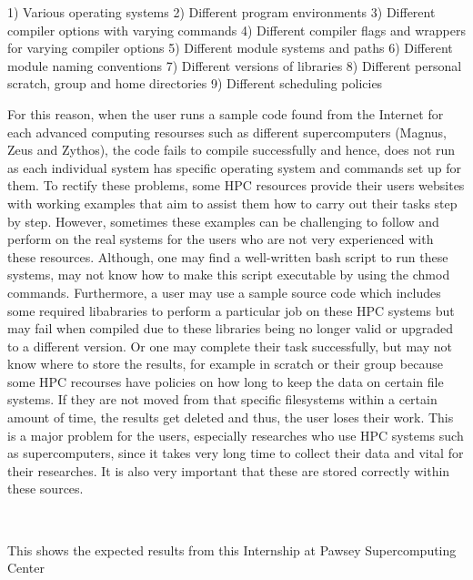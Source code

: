 \begin{Document}
{\begin{Introduction}
1) Various operating systems 
2) Different program environments
3) Different compiler options with varying commands
4) Different compiler flags and wrappers for varying compiler options
5) Different module systems and paths
6) Different module naming conventions
7) Different versions of libraries
8) Different personal scratch, group and home directories
9) Different scheduling policies

For this reason, when the user runs a sample code found from the Internet for each advanced computing resourses such as different supercomputers (Magnus,
Zeus and Zythos), the code fails to compile successfully and hence, does not run as each individual system has specific operating system and 
commands set up for them. To rectify these problems, some HPC resources provide their users websites with working examples that aim to assist them how to
carry out their tasks step by step. However, sometimes these examples can be challenging to follow and perform on the real systems for the users who are 
not very experienced with these resources. Although, one may find a well-written bash script to run these systems, may not know how to make this script
executable by using the chmod commands. Furthermore, a user may use a sample source code which includes some required libabraries to perform a particular
job on these HPC systems but may fail when compiled due to these libraries being no longer valid or upgraded to a different version. Or one may complete 
their task successfully, but may not know where to store the results, for example in scratch or their group because some HPC recourses have policies on 
how long to keep the data on certain file systems. If they are not moved from that specific filesystems within a certain amount of time, the results get
deleted and thus, the user loses their work. This is a major problem for the users, especially researches who use HPC systems such as supercomputers,
since it takes very long time to collect their data and vital for their researches. It is also very important that these are stored correctly within
these sources.




 





\end{Introduction}
\
\

\begin{scope}

This shows the expected results from this Internship at Pawsey Supercomputing Center
\
\




\end{scope}}
\end{Document}
